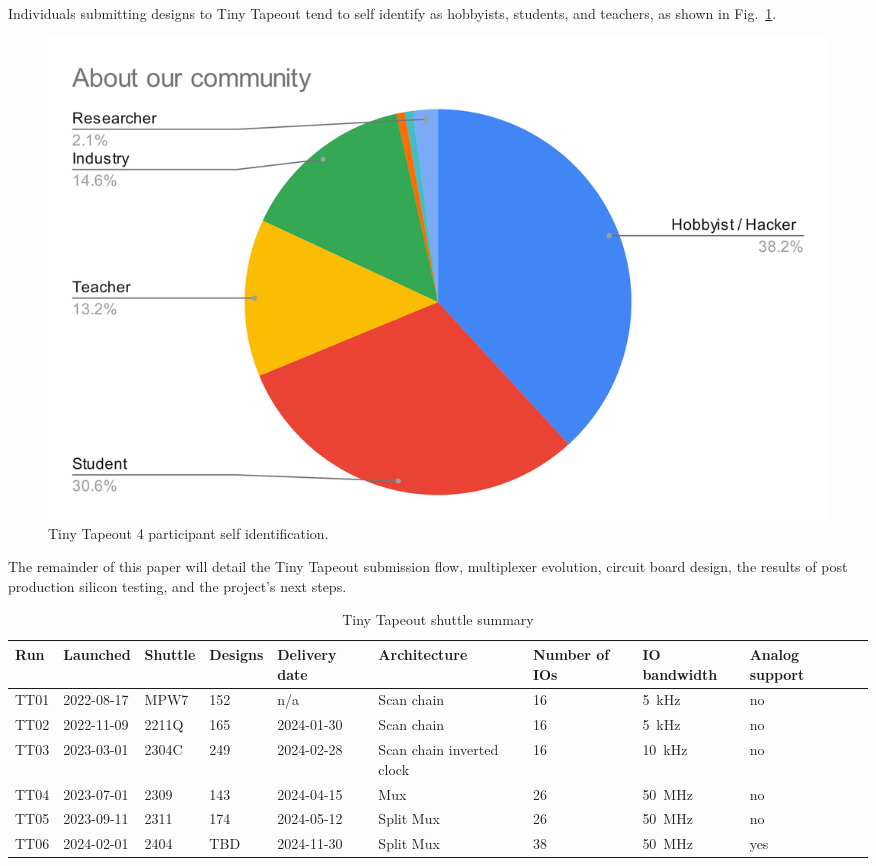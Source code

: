 Individuals submitting designs to Tiny Tapeout tend to self identify as hobbyists, students, and teachers, as shown in Fig.~\ref{fig:TT04_submitters}.

\begin{figure}[!t]
\centering
\includegraphics[width=\columnwidth]{./Figs/about our community pie chart.png}
\caption{Tiny Tapeout 4 participant self identification.}
\label{fig:TT04_submitters}
\end{figure}

The remainder of this paper will detail the Tiny Tapeout submission flow, multiplexer evolution, circuit board design, the results of post production silicon testing, and the project's next steps.

\begin{table}[!t]
\centering
\caption{Tiny Tapeout shuttle summary}
\label{tab:tinytapeout}
\begin{tabularx}{\textwidth}{@{}l *{9}{X}@{}}
\toprule
\textbf{Run} & \textbf{Launched} & \textbf{Shuttle} & \textbf{Designs} & \textbf{Delivery date} & \textbf{Architecture} & \textbf{Number of IOs} & \textbf{IO bandwidth} & \textbf{Analog support} \\
\midrule
TT01 & 2022-08-17  & MPW7  & 152 & n/a        & Scan chain                & 16 & \qty{5}{\kHz}    & no  \\
TT02 & 2022-11-09  & 2211Q & 165 & 2024-01-30 & Scan chain                & 16 & \qty{5}{\kHz}    & no  \\
TT03 & 2023-03-01  & 2304C & 249 & 2024-02-28 & Scan chain inverted clock & 16 & \qty{10}{\kHz}    & no  \\
TT04 & 2023-07-01  & 2309  & 143 & 2024-04-15 & Mux                       & 26 & \qty{50}{\MHz}   & no  \\
TT05 & 2023-09-11  & 2311  & 174 & 2024-05-12 & Split Mux                 & 26 & \qty{50}{\MHz}   & no  \\
TT06 & 2024-02-01  & 2404  & TBD & 2024-11-30 & Split Mux                 & 38 & \qty{50}{\MHz}   & yes \\
\bottomrule
\end{tabularx}
\end{table}

